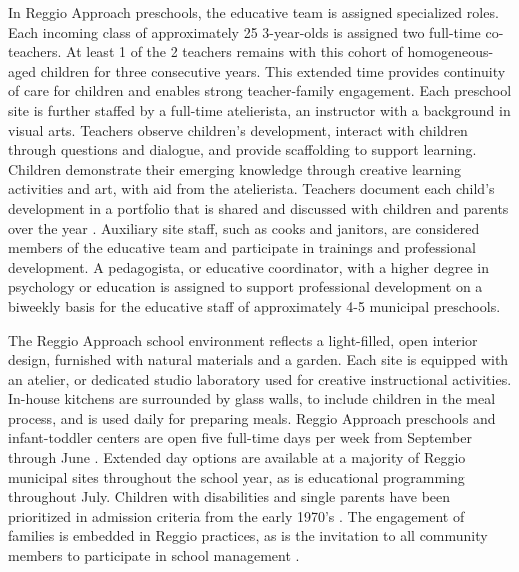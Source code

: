 In Reggio Approach preschools, the educative team is assigned specialized roles. Each incoming class of approximately 25 3-year-olds is assigned two full-time co-teachers. At least 1 of the 2 teachers remains with this cohort of homogeneous-aged children for three consecutive years. This extended time provides continuity of care for children and enables strong teacher-family engagement. Each preschool site is further staffed by a full-time atelierista, an instructor with a background in visual arts. Teachers observe children's development, interact with children through questions and dialogue, and provide scaffolding to support learning. Children demonstrate their emerging knowledge through creative learning activities and art, with aid from the atelierista. Teachers document each child's development in a portfolio that is shared and discussed with children and parents over the year \citep{Rinaldi_2006_ReggioEmilia_BOOK,Giudici-Nicolosi_2014_Reggio-Approach}. Auxiliary site staff, such as cooks and janitors, are considered members of the educative team and participate in trainings and professional development. A pedagogista, or educative coordinator, with a higher degree in psychology or education is assigned to support professional development on a biweekly basis for the educative staff of approximately 4-5 municipal preschools. 

The Reggio Approach school environment reflects a light-filled, open interior design, furnished with natural materials and a garden. Each site is equipped with an atelier, or dedicated studio laboratory used for creative instructional activities. In-house kitchens are surrounded by glass walls, to include children in the meal process, and is used daily for preparing meals. Reggio Approach preschools and infant-toddler centers are open five full-time days per week from September through June \citep{Giudici-Nicolosi_2014_Reggio-Approach}. Extended day options are available at a majority of Reggio municipal sites throughout the school year, as is educational programming throughout July. Children with disabilities and single parents have been prioritized in admission criteria from the early 1970's \citep{Edwards-etal-eds_1998_Hundred-Languages}. The engagement of families is embedded in Reggio practices, as is the invitation to all community members to participate in school management \citep{CEHD_2016_Historical-Analysis,Cagliari-etal-eds_2016_BOOK_Loris-Malaguzzi}. 



